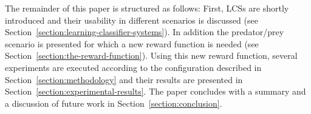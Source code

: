 The remainder of this paper is structured as follows: First, LCSs are shortly introduced and their usability in different scenarios is discussed (see Section~\ref{section:learning-classifier-systems}). 
In addition the predator/prey scenario is presented for which a new reward function is needed (see Section~\ref{section:the-reward-function}). Using this new reward function, several experiments are executed according to the configuration described in Section~\ref{section:methodology} and their results are presented in Section~\ref{section:experimental-results}. The paper concludes with a summary and a discussion of future work in Section~\ref{section:conclusion}. %
